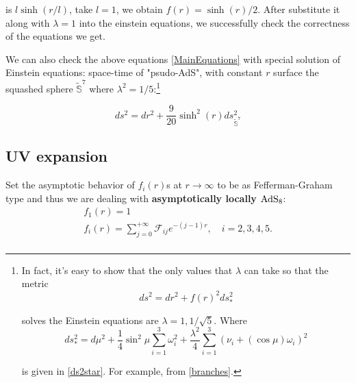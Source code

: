 \documentclass[12pt, a4paper]{article}
\numberwithin{equation}{section}
\newcommand{\be}{\begin{equation}}
\newcommand{\ee}{\end{equation}}
\newcommand{\cF}{\mathcal{F}}
\begin{document}
	is $l\sinh(r/l)$, take $l = 1$, we obtain $f(r) = \sinh(r)/2$. After substitute it along with $\lambda = 1$ into the einstein equations, we successfully check the correctness of the equations we get. 
	
	We can also check the above equations \ref{MainEquations} with special solution of Einstein equations: space-time of "psudo-AdS", with constant $r$ surface the squashed sphere $\tilde{\mathbb{S}}^7$ where $\lambda^2 = 1/5$:\footnote{In fact, it's easy to show that the only values that $\lambda$ can take so that the metric
\be
	ds^2 = dr^2 + f(r)^2 ds_*^2
\ee

	solves the Einstein equations are $\lambda = 1, 1/\sqrt{5}$. Where
\be
	ds_{*}^2 = d\mu^2 +\frac{1}{4}\sin^2\mu \sum\limits_{i=1}^3 \omega_i^2 + \frac{\lambda^2}{4}\sum\limits_{i=1}^3 (\nu_i + (\cos\mu)\omega_i)^2
\ee 

	is given in \ref{ds2star}. For example, from \ref{branches}.}
	
\be
	ds^2 = dr^2 + \frac{9}{20}\sinh^2(r) ds^2_{\tilde{\mathbb{S}}^7}
	\label{AdSwithSquashedS7}
\ee

\subsection{UV expansion}

Set the asymptotic behavior of $f_i(r)$s at $r\rightarrow \infty$ to be as Fefferman-Graham type and thus we are dealing with \textbf{asymptotically locally ${\rm AdS_8}$}:
\be
\begin{aligned}
	&f_1(r) = 1&\\
	&f_i(r) = \sum\limits_{j = 0}^{+\infty} \cF_{ij}e^{-(j-1)r},\quad i = 2,3,4,5.&\\
\end{aligned}
\ee
\end{document}
